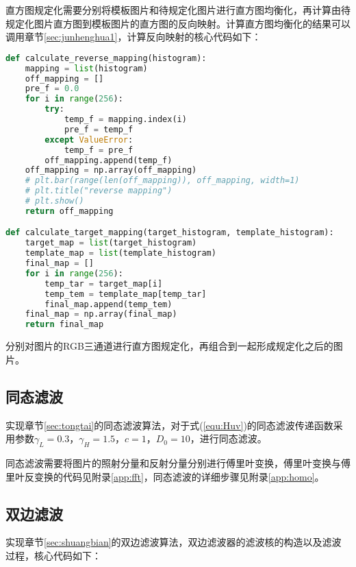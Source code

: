 \documentclass{hitreport}
\begin{document}
直方图规定化需要分别将模板图片和待规定化图片进行直方图均衡化，再计算由待规定化图片直方图到模板图片的直方图的反向映射。计算直方图均衡化的结果可以调用章节\ref{sec:junhenghua1}，计算反向映射的核心代码如下：
\begin{lstlisting}[language=python]
def calculate_reverse_mapping(histogram):
    mapping = list(histogram)
    off_mapping = []
    pre_f = 0.0
    for i in range(256):
        try:
            temp_f = mapping.index(i)
            pre_f = temp_f
        except ValueError:
            temp_f = pre_f
        off_mapping.append(temp_f)
    off_mapping = np.array(off_mapping)
    # plt.bar(range(len(off_mapping)), off_mapping, width=1)
    # plt.title("reverse mapping")
    # plt.show()
    return off_mapping

def calculate_target_mapping(target_histogram, template_histogram):
    target_map = list(target_histogram)
    template_map = list(template_histogram)
    final_map = []
    for i in range(256):
        temp_tar = target_map[i]
        temp_tem = template_map[temp_tar]
        final_map.append(temp_tem)
    final_map = np.array(final_map)
    return final_map
\end{lstlisting}

分别对图片的RGB三通道进行直方图规定化，再组合到一起形成规定化之后的图片。

\subsection{同态滤波}\label{sec:tongtailv}

实现章节\ref{sec:tongtai}的同态滤波算法，对于式(\ref{equ:Huv})的同态滤波传递函数采用参数$\gamma_L=0.3$，$\gamma_H = 1.5$，$c=1$，$D_0=10$，进行同态滤波。

同态滤波需要将图片的照射分量和反射分量分别进行傅里叶变换，傅里叶变换与傅里叶反变换的代码见附录\ref{app:fft}，同态滤波的详细步骤见附录\ref{app:homo}。


\subsection{双边滤波}

实现章节\ref{sec:shuangbian}的双边滤波算法，双边滤波器的滤波核的构造以及滤波过程，核心代码如下：
\end{document}
